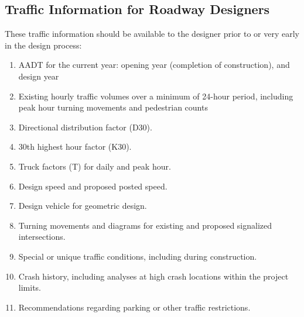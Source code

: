 \documentclass{article}
\begin{document}
  \subsection{Traffic Information for Roadway Designers}
  These traffic information should be available to the designer prior to or very early in the design process:
  \begin{enumerate}
    \item AADT for the current year: opening year (completion of construction), and design year
    \item Existing hourly traffic volumes over a minimum of 24-hour period, including peak hour turning movements and pedestrian counts
    \item Directional distribution factor (D30).
    \item 30th highest hour factor (K30).
    \item Truck factors (T) for daily and peak hour.
    \item Design speed and proposed posted speed.
    \item Design vehicle for geometric design.
    \item Turning movements and diagrams for existing and proposed signalized intersections.
    \item Special or unique traffic conditions, including during construction.
    \item Crash history, including analyses at high crash locations within the project limits.
    \item Recommendations regarding parking or other traffic restrictions.
  \end{enumerate}




\end{document}
